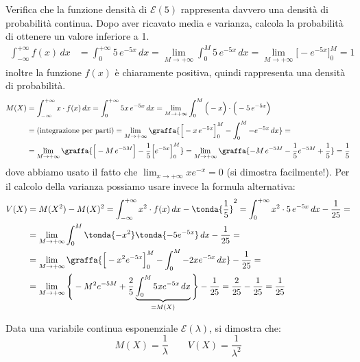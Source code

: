 \begin{esempio} Verifica che la funzione densità di $\mathcal{E} (5)$ rappresenta davvero una densità di probabilità continua. Dopo aver ricavato media e varianza, calcola la probabilità di ottenere un valore inferiore a 1.
\[\begin{split}\int_{-\infty}^{+\infty} f(x) \, dx &= \int_0^{+\infty} 5\, e^{-5x} \,dx  = \lim_{M\rightarrow +\infty} \int_0^M 5 \, e^{-5x} \,dx =  \lim_{M \rightarrow +\infty} \Big[-e^{-5x}\Big]_0^M = 1\end{split} \]
inoltre la funzione $f(x)$ è chiaramente positiva, quindi rappresenta una densità di probabilità.
\[\begin{split}M(X) &= \int_{-\infty}^{+\infty}x\cdot  f(x) \, dx =\int_{0}^{+\infty} 5x\, e^{-5x} \, dx =\lim_{M\rightarrow +\infty} \int_{0}^{M} \Big(-x\Big) \cdot \Big(-5\, e^{-5x}\Big) \\& = \text{(integrazione per parti)} = \lim_{M\rightarrow +\infty} \graffa{ \Big[-x \,e^{-5x}\Big]_0^M-\int_0^M -e^{-5x} \,dx} = \\
&=\lim_{M\rightarrow +\infty} \graffa{ \Big[-M \,e^{-5M}\Big]-\frac{1}{5}\Big[e^{-5x} \Big]_0^M} = \lim_{M\rightarrow +\infty} \graffa{-M \,e^{-5M}-\frac{1}{5} e^{-5M}+\frac{1}{5}} = \frac{1}{5} \end{split} \]
dove abbiamo usato il fatto che $\displaystyle \lim_{x\rightarrow +\infty} x e^{-x} = 0$ \;(si dimostra facilmente!). Per il calcolo della varianza possiamo usare invece la formula alternativa:
\[\begin{split}V(X) &= M(X^2)-M(X)^2 = \int_{-\infty}^{+\infty}x^2 \cdot  f(x) \, dx - \tonda{ \frac{1}{5}}^2 = \int_{0}^{+\infty}x^2 \cdot  5\,e^{-5x} \, dx -  \frac{1}{25} = \\ &= 
\lim_{M\rightarrow +\infty} \int_0^M \tonda{-x^2} \tonda{-5 e^{-5x}}\,dx  -  \frac{1}{25} =\\&= \lim_{M\rightarrow +\infty}\graffa{ \Big[ -x^2 e^{-5x} \Big]_0^M - \int_0^M -2x e^{-5x} \,dx}  -  \frac{1}{25}= \\
&=   \lim_{M\rightarrow +\infty}\Bigg\{-M^2 e^{-5M} +\frac{2}{5} \underbrace{\int_0^M 5x e^{-5x} \,dx}_{=M(X)}\Bigg\}  -  \frac{1}{25}= \frac{2}{25}-\frac{1}{25} = \frac{1}{25}
 \end{split} \]
\end{esempio}


\begin{proprieta} Data una variabile continua esponenziale $\mathcal{E}(\lambda)$, si dimostra che: 
\[\boxed{M(X) =\dfrac{1}{\lambda}} \qquad \boxed{V(X) = \dfrac{1}{\lambda^2}}\]
\end{proprieta}


